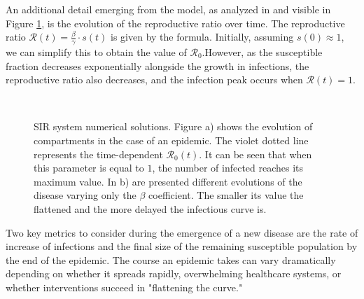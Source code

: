An additional detail emerging from the model, as analyzed in \cite{Okabe_2020} and visible in Figure \ref{fig:sir_example0}, is the evolution of the reproductive ratio over time. The reproductive ratio $\mathcal{R}(t) = \frac{\beta}{\gamma} \cdot s(t)$ is given by the formula. Initially, assuming $s(0)\approx 1$, we can simplify this to obtain the value of $\mathcal{R}_0$.However, as the susceptible fraction decreases exponentially alongside the growth in infections, the reproductive ratio also decreases, and the infection peak occurs when $\mathcal{R}(t)=1$.


\begin{figure}[h]
	\centering
	 \quad
	 \\
	\caption[SIR dynamic example]{SIR system numerical solutions. Figure a) shows the evolution of compartments in the case of an epidemic. The violet dotted line represents the time-dependent $\mathcal{R}_0(t)$. It can be seen that when this parameter is equal to $1$, the number of infected reaches its maximum value. In b) are presented different evolutions of the disease varying only the $\beta$ coefficient. The smaller its value the flattened and the more delayed the infectious curve is.}
	\label{fig:sir_example0}
\end{figure}
Two key metrics to consider during the emergence of a new disease are the rate of increase of infections and the final size of the remaining susceptible population by the end of the epidemic. The course an epidemic takes can vary dramatically depending on whether it spreads rapidly, overwhelming healthcare systems, or whether interventions succeed in "flattening the curve."
